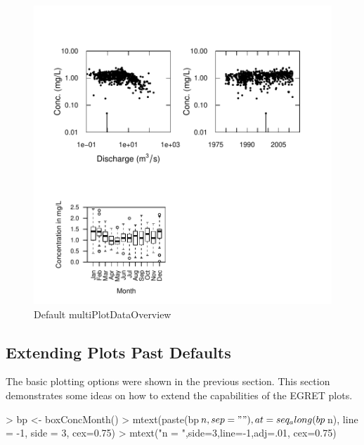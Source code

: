 \documentclass[a4paper,11pt]{article}
\begin{document}
\begin{figure}[ht]
\begin{center}

\includegraphics{EGRET-figmultiPlotDataOverview}
\end{center}
\caption{Default multiPlotDataOverview}
\label{fig:multiPlotDataOverview}
\end{figure}

\FloatBarrier

\subsection{Extending Plots Past Defaults}
\label{sec:extendedPlots}
The basic plotting options were shown in the previous section.  This section demonstrates some ideas on how to extend the capabilities of the EGRET plots.


\begin{Schunk}
\begin{Sinput}
>   bp <- boxConcMonth()
>   mtext(paste(bp$n, sep = ""), at = seq_along(bp$n), 
         line = -1, side = 3, cex=0.75)
>   mtext("n = ",side=3,line=-1,adj=.01, cex=0.75)
\end{Sinput}
\end{Schunk}
\end{document}
